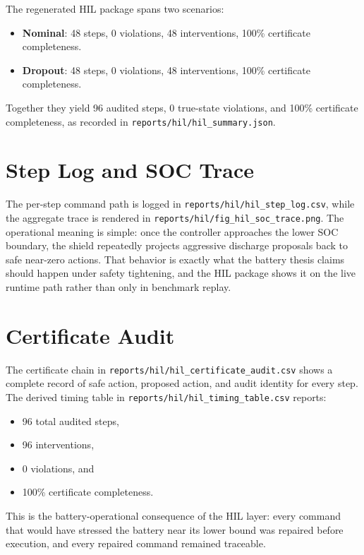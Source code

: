 The regenerated HIL package spans two scenarios:

\begin{itemize}
  \item \textbf{Nominal}: 48 steps, 0 violations, 48 interventions,
    100\% certificate completeness.
  \item \textbf{Dropout}: 48 steps, 0 violations, 48 interventions,
    100\% certificate completeness.
\end{itemize}

Together they yield 96 audited steps, 0 true-state violations, and 100\%
certificate completeness, as recorded in
\texttt{reports/hil/hil\_summary.json}.

\section{Step Log and SOC Trace}

The per-step command path is logged in
\texttt{reports/hil/hil\_step\_log.csv}, while the aggregate trace is rendered
in \texttt{reports/hil/fig\_hil\_soc\_trace.png}.  The operational meaning is
simple: once the controller approaches the lower SOC boundary, the shield
repeatedly projects aggressive discharge proposals back to safe near-zero
actions.  That behavior is exactly what the battery thesis claims should
happen under safety tightening, and the HIL package shows it on the live
runtime path rather than only in benchmark replay.

\section{Certificate Audit}

The certificate chain in
\texttt{reports/hil/hil\_certificate\_audit.csv} shows a complete record of
safe action, proposed action, and audit identity for every step.  The
derived timing table in \texttt{reports/hil/hil\_timing\_table.csv} reports:

\begin{itemize}
  \item 96 total audited steps,
  \item 96 interventions,
  \item 0 violations, and
  \item 100\% certificate completeness.
\end{itemize}

This is the battery-operational consequence of the HIL layer: every command
that would have stressed the battery near its lower bound was repaired before
execution, and every repaired command remained traceable.

